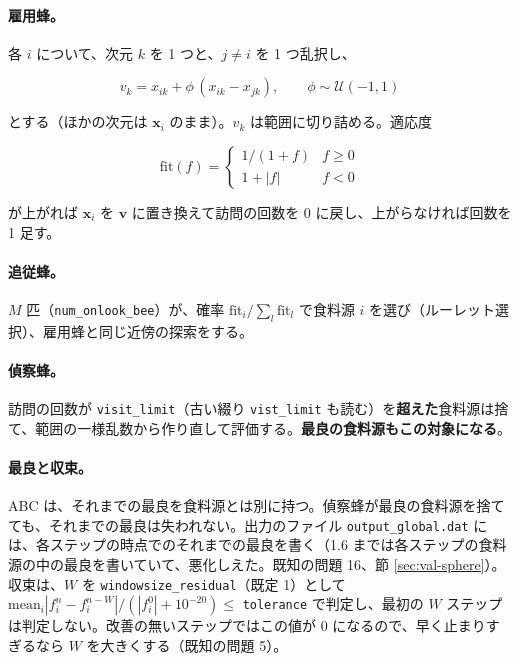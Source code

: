 \documentclass[11pt,a4paper,dvipdfmx]{jsarticle}
\begin{document}
\paragraph{雇用蜂。} 各 $i$ について、次元 $k$ を 1 つと、$j \ne i$ を 1 つ乱択し、

\begin{equation}
  v_{k} = x_{ik} + \phi\,(x_{ik} - x_{jk}),\qquad \phi \sim \mathcal{U}(-1, 1)
\end{equation}

とする（ほかの次元は $\mathbf{x}_i$ のまま）。$v_k$ は範囲に切り詰める。適応度

\begin{equation}
  \mathrm{fit}(f) = \begin{cases} 1/(1+f) & f \ge 0 \\ 1 + |f| & f < 0 \end{cases}
\end{equation}

が上がれば $\mathbf{x}_i$ を $\mathbf{v}$ に置き換えて訪問の回数を 0 に戻し、上がらなければ回数を 1 足す。

\paragraph{追従蜂。} $M$ 匹（\texttt{num\_onlook\_bee}）が、確率 $\mathrm{fit}_i / \sum_l \mathrm{fit}_l$ で食料源 $i$ を選び（ルーレット選択）、雇用蜂と同じ近傍の探索をする。

\paragraph{偵察蜂。} 訪問の回数が \texttt{visit\_limit}（古い綴り \texttt{vist\_limit} も読む）を\textbf{超えた}食料源は捨て、範囲の一様乱数から作り直して評価する。\textbf{最良の食料源もこの対象になる}。

\paragraph{最良と収束。} ABC は、それまでの最良を食料源とは別に持つ。偵察蜂が最良の食料源を捨てても、それまでの最良は失われない。出力のファイル \texttt{output\_global.dat} には、各ステップの時点でのそれまでの最良を書く（1.6 までは各ステップの食料源の中の最良を書いていて、悪化しえた。既知の問題 16、節 \ref{sec:val-sphere}）。収束は、$W$ を \texttt{windowsize\_residual}（既定 1）として $\mathrm{mean}_i |f_i^n - f_i^{n-W}| / (|f_i^{0}| + 10^{-20}) \le$ \texttt{tolerance} で判定し、最初の $W$ ステップは判定しない。改善の無いステップではこの値が 0 になるので、早く止まりすぎるなら $W$ を大きくする（既知の問題 5）。
\end{document}
